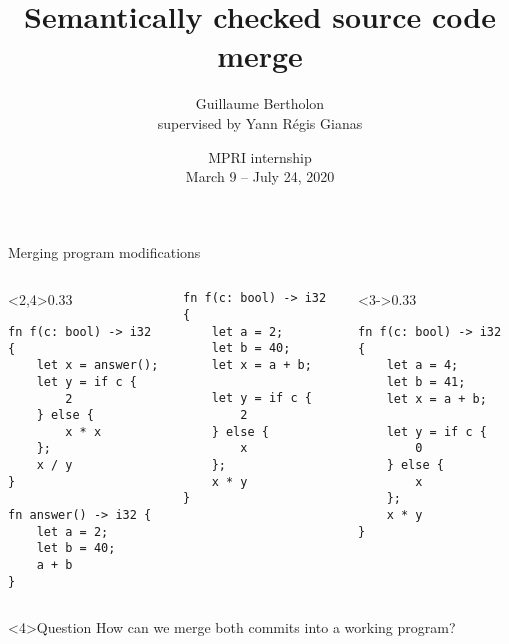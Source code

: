 \documentclass{beamer}
\title{Semantically checked source code merge}
\author[Guillaume Bertholon]{Guillaume Bertholon\\ supervised by Yann Régis Gianas}
\institute[IRIF]{IRIF -- Université de Paris}
\date[MPRI internship -- 2020]{MPRI internship\\
March 9 -- July 24, 2020}
\begin{document}
\begin{frame}
 \maketitle
\end{frame}

\begin{frame}[fragile]{Merging program modifications}
\begin{columns}
\begin{column}<2,4>{0.33\textwidth}
\vspace{0.5em}
\begin{lstlisting}[rulecolor=\color{blue!20}]
fn f(c: bool) -> i32 {
    let x = answer();
    let y = if c {
        2
    } else {
        x * x
    };
    x / y
}

fn answer() -> i32 {
    let a = 2;
    let b = 40;
    a + b
}
\end{lstlisting}
\end{column}
\begin{column}{0.33\textwidth}
\vspace{0.5em}
\begin{lstlisting}
fn f(c: bool) -> i32 {
    let a = 2;
    let b = 40;
    let x = a + b;

    let y = if c {
        2
    } else {
        x
    };
    x * y
}
\end{lstlisting}
\end{column}
\begin{column}<3->{0.33\textwidth}
\vspace{0.5em}
\begin{lstlisting}[rulecolor=\color{orange!30}]
fn f(c: bool) -> i32 {
    let a = 4;
    let b = 41;
    let x = a + b;

    let y = if c {
        0
    } else {
        x
    };
    x * y
}
\end{lstlisting}
\end{column}
\end{columns}

\begin{alertblock}<4>{Question}
How can we merge both commits into a working program?
\end{alertblock}

\end{frame}
\end{document}
